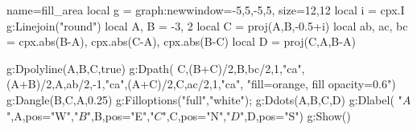 \documentclass[12pt]{standalone}
\begin{document}
\begin{luadraw}{name=fill_area}
local g = graph:new{window={-5,5,-5,5}, size={12,12}}
local i = cpx.I
g:Linejoin("round")
local A, B = -3, 2
local C = proj(A,{B,-0.5+i})
local ab, ac, bc = cpx.abs(B-A), cpx.abs(C-A), cpx.abs(B-C)
local D = proj(C,{A,B-A})

g:Dpolyline({A,B,C},true)
g:Dpath( {C,(B+C)/2,B,bc/2,1,"ca",(A+B)/2,A,ab/2,-1,"ca",(A+C)/2,C,ac/2,1,"ca"}, "fill=orange, fill opacity=0.6")
g:Dangle(B,C,A,0.25)
g:Filloptions("full","white"); g:Ddots({A,B,C,D})
g:Dlabel( "$A$",A,{pos="W"},"$B$",B,{pos="E"},"$C$",C,{pos="N"},"$D$",D,{pos="S"})
g:Show()
\end{luadraw}
\end{document}
